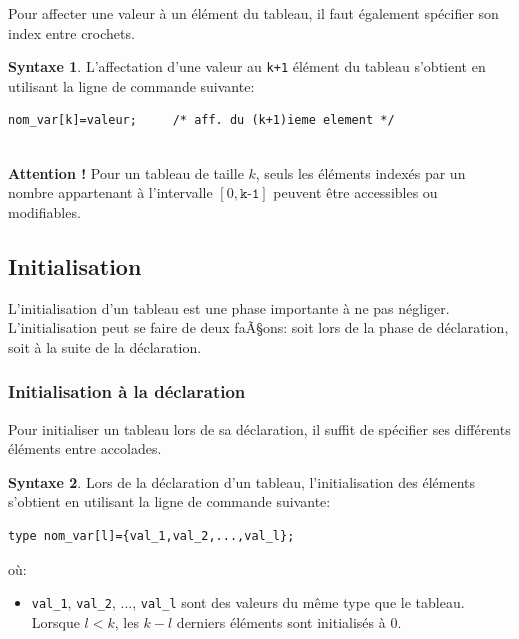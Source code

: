 \documentclass[a4paper,11pt]{book}
\newenvironment{warning} 
   {~\\ \textbf{Attention !}}{\\}
\theoremstyle{definition}
\newtheorem*{syntaxe}{Syntaxe}
\begin{document}
Pour affecter une valeur à un élément du tableau, il faut également spécifier son index entre crochets.
\begin{syntaxe}L'affectation d'une valeur au \texttt{k+1}\ieme{} élément du tableau s'obtient en utilisant la ligne de commande suivante:
\begin{lstlisting}
nom_var[k]=valeur;     /* aff. du (k+1)ieme element */
\end{lstlisting}
\end{syntaxe}

\begin{warning}
Pour un tableau de taille $k$, seuls les éléments indexés par un nombre appartenant à l'intervalle $[0,\texttt{k-1}]$ peuvent être accessibles ou modifiables.
\end{warning}

\subsection{Initialisation}
L'initialisation d'un tableau est une phase importante à ne pas négliger. L'initialisation peut se faire de deux faÃ§ons: soit lors de la phase de déclaration, soit à la suite de la déclaration.

\subsubsection{Initialisation à la déclaration}

Pour initialiser un tableau lors de sa déclaration, il suffit de spécifier ses différents éléments entre accolades.

\begin{syntaxe}Lors de la déclaration d'un tableau, l'initialisation des éléments s'obtient en utilisant la ligne de commande suivante:
\begin{lstlisting}
type nom_var[l]={val_1,val_2,...,val_l}; 
\end{lstlisting}
où:
\begin{itemize}
\item \texttt{val\_1}, \texttt{val\_2}, ..., \texttt{val\_l} sont des valeurs du même type que le tableau. Lorsque $l<k$, les $k-l$ derniers éléments sont initialisés à 0.
\end{itemize}
\end{syntaxe}


\end{document}
